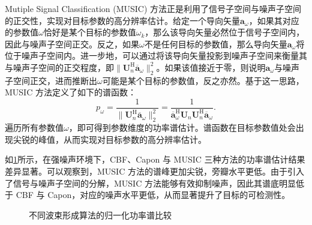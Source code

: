 Mutiple Signal Classification (MUSIC) 方法正是利用了信号子空间与噪声子空间的正交性，实现对目标参数的高分辨率估计。给定一个导向矢量\( \bm{a}_{\omega} \)，如果其对应的参数值\( \omega \)恰好是某个目标的参数值\( \omega_k \)，那么该导向矢量必然位于信号子空间内，因此与噪声子空间正交。反之，如果\( \omega \)不是任何目标的参数值，那么导向矢量\( \bm{a}_{\omega} \)将位于噪声子空间内。进一步地，可以通过将该导向矢量投影到噪声子空间来衡量其与噪声子空间的正交程度，即\( \|\mathbf{U}_{n}^{\mathrm{H}} \overline{\bm{a}}_{\omega}\|_2^2\)。如果该值接近于零，则说明\( \bm{a}_{\omega} \)与噪声子空间正交，进而推断出\( \omega \)可能是某个目标的参数值，反之亦然。基于这一思路，MUSIC 方法定义了如下的谱函数：
\[
    p_{\omega} = \frac{1}{\|\mathbf{U}_{n}^{\mathrm{H}} \overline{\bm{a}}_{\omega}\|_2^2} = \frac{1}{\overline{\bm{a}}_{\omega}^{\mathrm{H}} \mathbf{U}_{n} \mathbf{U}_{n}^{\mathrm{H}} \overline{\bm{a}}_{\omega}}.
\]
遍历所有参数值\( \omega \)，即可得到参数维度的功率谱估计。谱函数在目标参数值处会出现尖锐的峰值，从而实现对目标参数的高分辨率估计。

如\cref{fig_music_eg}所示，在强噪声环境下，CBF、Capon 与 MUSIC 三种方法的功率谱估计结果差异显著。可以观察到，MUSIC 方法的谱峰更加尖锐，旁瓣水平更低。由于引入了信号与噪声子空间的分解，MUSIC 方法能够有效抑制噪声，因此其谱底明显低于 CBF 与 Capon，对应的噪声水平更低，从而显著提升了目标的可检测性。

\begin{figure}[htb!]
    \centering
    \caption{不同波束形成算法的归一化功率谱比较}
    \label{fig_music_eg}
\end{figure}

